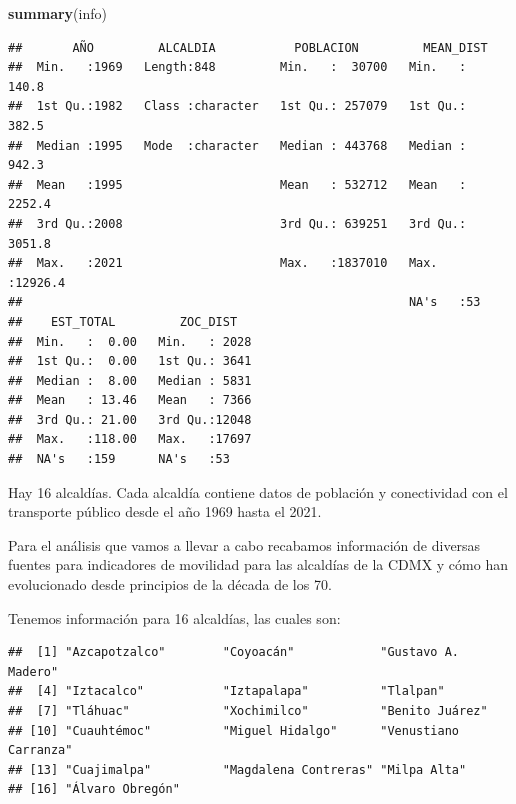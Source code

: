 \documentclass[
]{article}
\newenvironment{Shaded}{\begin{snugshade}}{\end{snugshade}}
\newcommand{\CommentTok}[1]{\textcolor[rgb]{0.56,0.35,0.01}{\textit{#1}}}
\newcommand{\KeywordTok}[1]{\textcolor[rgb]{0.13,0.29,0.53}{\textbf{#1}}}
\newcommand{\NormalTok}[1]{#1}
\newcommand{\OperatorTok}[1]{\textcolor[rgb]{0.81,0.36,0.00}{\textbf{#1}}}
\begin{document}
\begin{Shaded}
\begin{Highlighting}[]
\KeywordTok{summary}\NormalTok{(info)}
\end{Highlighting}
\end{Shaded}

\begin{verbatim}
##       AÑO         ALCALDIA           POBLACION         MEAN_DIST      
##  Min.   :1969   Length:848         Min.   :  30700   Min.   :  140.8  
##  1st Qu.:1982   Class :character   1st Qu.: 257079   1st Qu.:  382.5  
##  Median :1995   Mode  :character   Median : 443768   Median :  942.3  
##  Mean   :1995                      Mean   : 532712   Mean   : 2252.4  
##  3rd Qu.:2008                      3rd Qu.: 639251   3rd Qu.: 3051.8  
##  Max.   :2021                      Max.   :1837010   Max.   :12926.4  
##                                                      NA's   :53       
##    EST_TOTAL         ZOC_DIST    
##  Min.   :  0.00   Min.   : 2028  
##  1st Qu.:  0.00   1st Qu.: 3641  
##  Median :  8.00   Median : 5831  
##  Mean   : 13.46   Mean   : 7366  
##  3rd Qu.: 21.00   3rd Qu.:12048  
##  Max.   :118.00   Max.   :17697  
##  NA's   :159      NA's   :53
\end{verbatim}

Hay 16 alcaldías. Cada alcaldía contiene datos de población y
conectividad con el transporte público desde el año 1969 hasta el 2021.

Para el análisis que vamos a llevar a cabo recabamos información de
diversas fuentes para indicadores de movilidad para las alcaldías de la
CDMX y cómo han evolucionado desde principios de la década de los 70.

Tenemos información para 16 alcaldías, las cuales son:

\begin{Shaded}
\end{Shaded}

\begin{verbatim}
##  [1] "Azcapotzalco"        "Coyoacán"            "Gustavo A. Madero"  
##  [4] "Iztacalco"           "Iztapalapa"          "Tlalpan"            
##  [7] "Tláhuac"             "Xochimilco"          "Benito Juárez"      
## [10] "Cuauhtémoc"          "Miguel Hidalgo"      "Venustiano Carranza"
## [13] "Cuajimalpa"          "Magdalena Contreras" "Milpa Alta"         
## [16] "Álvaro Obregón"
\end{verbatim}
\end{document}
